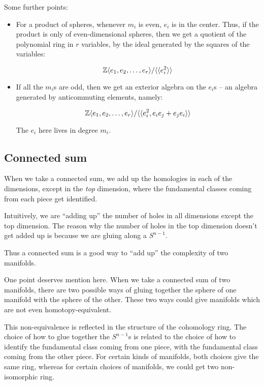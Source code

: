 \documentclass[a4paper]{amsart}
\begin{document}
Some further points:

\begin{itemize}

\item For a product of spheres, whenever $m_i$ is even, $e_i$ is in
  the center. Thus, if the product is only of even-dimensional
  spheres, then we get a quotient of the polynomial ring in $r$
  variables, by the ideal generated by the squares of the variables:

  $$\mathbb{Z}\langle e_1, e_2, \ldots, e_r \rangle/\langle \langle e_i^2 \rangle \rangle$$

\item If all the $m_i$s are odd, then we get an exterior algebra on
  the $e_i$s -- an algebra generated by anticommuting elements, namely:

  $$\mathbb{Z} \langle e_1, e_2, \ldots, e_r \rangle/\langle \langle e_i^2, e_ie_j + e_je_i \rangle \rangle$$

  The $e_i$ here lives in degree $m_i$.

\end{itemize}
 
\subsection{Connected sum}

When we take a connected sum, we add up the homologies in each of the
dimensions, except in the {\em top} dimension, where the fundamental
classes coming from each piece get identified.

Intuitively, we are ``adding up'' the number of holes in all
dimensions except the top dimension. The reason why the number of
holes in the top dimension doesn't get added up is because we are
gluing along a $S^{n-1}$.

Thus a connected sum is a good way to ``add up'' the complexity of two
manifolds.

One point deserves mention here. When we take a connected sum of two
manifolds, there are two possible ways of gluing together the sphere
of one manifold with the sphere of the other. These two ways could
give manifolds which are not even homotopy-equivalent.

This non-equivalence is reflected in the structure of the cohomology
ring.  The choice of how to glue together the $S^{n-1}$s is related to
the choice of how to identify the fundamental class coming from one
piece, with the fundamental class coming from the other piece. For
certain kinds of manifolds, both choices give the same ring, whereas
for certain choices of manifolds, we could get two non-isomorphic ring.
\end{document}
